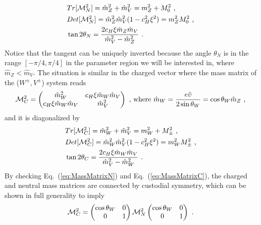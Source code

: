 \begin{align}
  \label{eq:detMN}
  &Tr[\mathcal{M}_{N}^{2}]=\hat{m}_{Z}^{2}+\hat{m}_{V}^{2}=m_{Z}^{2}+M_{0}^{2}\textup{ ,}\nonumber\\
  &Det[\mathcal{M}_{N}^{2}]=\hat{m}_{Z}^{2}\hat{m}_{V}^{2}(1-c_{H}^{2}\xi^{2})=m_{Z}^{2}M_{0}^{2}\textup{ ,}\nonumber\\
  &\tan{2\theta_{N}}=\frac{2c_{H}\xi \hat{m}_{Z} \hat{m}_{V}}{\hat{m}_{V}^{2}-\hat{m}_{Z}^{2}}\textup{ .}
\end{align}
Notice that the tangent can be uniquely inverted because the angle $\theta_{N}$ is in the range $[-\pi/4,\pi/4]$ in the parameter region we will be interested in, where $\hat{m}_{Z}<\hat{m}_{V}$.
\newline The situation is similar in the charged vector where the mass matrix of the ($W^{\pm},V^{\pm}$) system reads
\begin{align}
  \label{eq:MassMatrixC}
  \mathcal{M}_{C}^{2}=
  \begin{pmatrix}
    \hat{m}_{W}^{2} & c_{H}\xi \hat{m}_{W} \hat{m}_{V}\\
    c_{H}\xi \hat{m}_{W} \hat{m}_{V} & \hat{m}_{V}^{2}
  \end{pmatrix}
  \textup{ , where }
  \hat{m}_{W}=\frac{e\hat{\upsilon}}{2\sin{\theta_{W}}}=\cos{\theta_{W}}\hat{m}_{Z}
  \textup{ ,}
\end{align}
and it is diagonalized by
\begin{align}
  \label{eq:detMC}
  &Tr[\mathcal{M}_{C}^{2}]=\hat{m}_{W}^{2}+\hat{m}_{V}^{2}=m_{W}^{2}+M_{\pm}^{2}\textup{ ,}\nonumber\\
  &Det[\mathcal{M}_{C}^{2}]=\hat{m}_{W}^{2}\hat{m}_{V}^{2}(1-c_{H}^{2}\xi^{2})=m_{W}^{2}M_{\pm}^{2}\textup{ ,}\nonumber\\
  &\tan{2\theta_{C}}=\frac{2c_{H}\xi \hat{m}_{W} \hat{m}_{V}}{\hat{m}_{V}^{2}-\hat{m}_{W}^{2}}\textup{ .}
\end{align}
By checking Eq.~(\ref{eq:MassMatrixN}) and Eq.~(\ref{eq:MassMatrixC}), the charged and neutral mass matrices are connected by custodial symmetry, which can be shown in full generality to imply
\begin{align}
  \mathcal{M}_{C}^{2}=
  \begin{pmatrix}
    \cos{\theta_{W}} & 0\\
    0&1
  \end{pmatrix}
  \mathcal{M}_{N}^{2}
  \begin{pmatrix}
    \cos{\theta_{W}} & 0\\
    0&1
  \end{pmatrix}
  \textup{ .}
\end{align}
